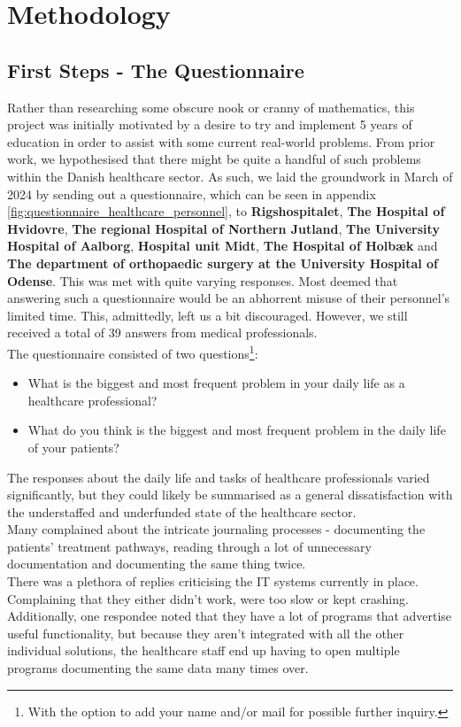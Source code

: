 \section{Methodology}
\subsection{First Steps - The Questionnaire}\label{sec:Questionnaire}
Rather than researching some obscure nook or cranny of mathematics, this project was initially motivated by a desire to try and implement 5 years of education in order to assist with some current real-world problems. From prior work, we hypothesised that there might be quite a handful of such problems within the Danish healthcare sector. As such, we laid the groundwork in March of 2024 by sending out a questionnaire, which can be seen in appendix \autoref{fig:questionnaire_healthcare_personnel}, to \textbf{Rigshospitalet}, \textbf{The Hospital of Hvidovre}, \textbf{The regional Hospital of Northern Jutland}, \textbf{The University Hospital of Aalborg}, \textbf{Hospital unit Midt}, \textbf{The Hospital of Holbæk} and \textbf{The department of orthopaedic surgery at the University Hospital of Odense}. This was met with quite varying responses. Most deemed that answering such a questionnaire would be an abhorrent misuse of their personnel's limited time. This, admittedly, left us a bit discouraged. However, we still received a total of 39 answers from medical professionals.
\\
The questionnaire consisted of two questions\footnote{With the option to add your name and/or mail for possible further inquiry.}:
\begin{itemize}
    \item What is the biggest and most frequent problem in your daily life as a healthcare professional?
    \item What do you think is the biggest and most frequent problem in the daily life of your patients?
\end{itemize}
The responses about the daily life and tasks of healthcare professionals varied significantly, but they could likely be summarised as a general dissatisfaction with the understaffed and underfunded state of the healthcare sector.
\\
Many complained about the intricate journaling processes - documenting the patients' treatment pathways, reading through a lot of unnecessary documentation and documenting the same thing twice. 
\\
There was a plethora of replies criticising the IT systems currently in place. Complaining that they either didn't work, were too slow or kept crashing. Additionally, one respondee noted that they have a lot of programs that advertise useful functionality, but because they aren't integrated with all the other individual solutions, the healthcare staff end up having to open multiple programs documenting the same data many times over.
